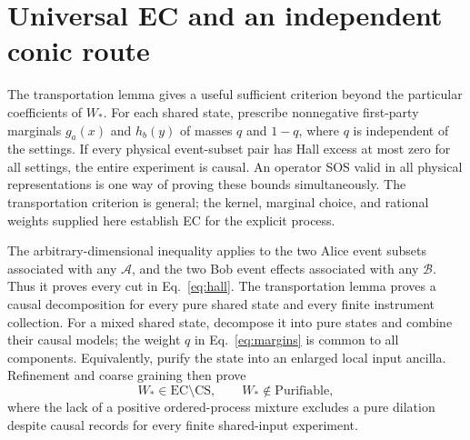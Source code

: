 \documentclass[11pt]{article}
\newcommand{\CS}{\mathrm{CS}}
\newcommand{\EC}{\mathrm{EC}}
\begin{document}
\section{Universal EC and an independent conic route}
\label{sec:universal}
The transportation lemma gives a useful sufficient criterion beyond the particular coefficients of $W_*$. For each shared state, prescribe nonnegative first-party marginals $g_a(x)$ and $h_b(y)$ of masses $q$ and $1-q$, where $q$ is independent of the settings. If every physical event-subset pair has Hall excess at most zero for all settings, the entire experiment is causal. An operator SOS valid in all physical representations is one way of proving these bounds simultaneously. The transportation criterion is general; the kernel, marginal choice, and rational weights supplied here establish EC for the explicit process.

The arbitrary-dimensional inequality applies to the two Alice event subsets associated with any $\mathcal A$, and the two Bob event effects associated with any $\mathcal B$. Thus it proves every cut in Eq.~\eqref{eq:hall}. The transportation lemma proves a causal decomposition for every pure shared state and every finite instrument collection. For a mixed shared state, decompose it into pure states and combine their causal models; the weight $q$ in Eq.~\eqref{eq:margins} is common to all components. Equivalently, purify the state into an enlarged local input ancilla. Refinement and coarse graining then prove
\begin{equation}
 W_*\in\EC\setminus\CS,\qquad W_*\notin\mathrm{Purifiable},
 \label{eq:final-theorem}
\end{equation}
where the lack of a positive ordered-process mixture excludes a pure dilation despite causal records for every finite shared-input experiment.
\end{document}
